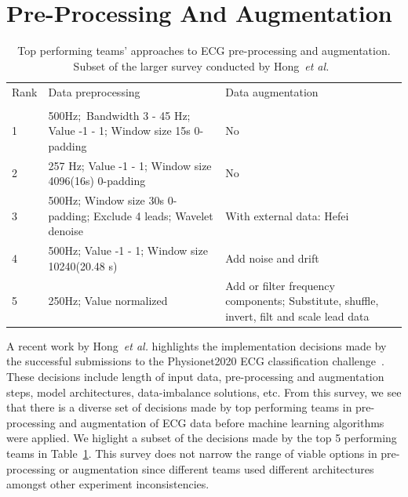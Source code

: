 \documentclass{article}
\begin{document}
\section{Pre-Processing And Augmentation}
\label{sec:processing}
\begin{table}[tpb]
\centering
\begin{tabular}{lll}

Rank &                                                                 Data preprocessing &                                                                          Data augmentation \\
                                             \\
1    &  500Hz;\ Bandwidth 3 - 45 Hz; Value -1 - 1; Window size 15s 0-padding &                                                                                         No \\
2    &                257 Hz; Value -1 - 1; Window size 4096(16s) 0-padding &                                                                                         No \\
3    &   500Hz; Window size 30s 0-padding; Exclude 4 leads; Wavelet denoise &                                                                  With external data: Hefei \\
4    &                     500Hz; Value -1 - 1; Window size 10240(20.48 s)  &                                                                        Add noise and drift \\
5    &                                              250Hz; Value normalized &  Add or filter frequency components; Substitute, shuffle, invert, filt and scale lead data \\
\end{tabular}
\caption{Top performing teams' approaches to ECG pre-processing and augmentation. Subset of the larger survey conducted by Hong~\textit{et al.}~\cite{hong2022practical}}
\label{tab:hong_top5}
\end{table}
A recent work by Hong~\textit{et al.} highlights the implementation decisions made by the successful submissions to the Physionet2020 ECG classification challenge~\cite{hong2022practical}. These decisions include length of input data, pre-processing and augmentation steps, model architectures, data-imbalance solutions, etc. From this survey, we see that there is a diverse set of decisions made by top performing teams in pre-processing and augmentation of ECG data before machine learning algorithms were applied. We higlight a subset of the decisions made by the top 5 performing teams in Table~\ref{tab:hong_top5}.  This survey does not narrow the range of viable options in pre-processing or augmentation since different teams used different architectures amongst other experiment inconsistencies. 
\end{document}
